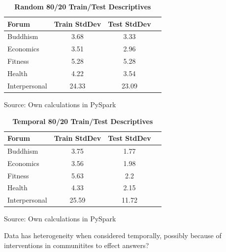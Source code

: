 \documentclass[11pt,preprint, authoryear]{article}
\numberwithin{equation}{section}
\begin{document}
\begin{longtable}[htbp] {@{} lccc @{}} 
\caption{\textbf{Random 80/20 Train/Test Descriptives}} 
\label{tab:tr-te} \\
\toprule
\textbf{Forum} &  \textbf{Train StdDev} &  \textbf{Test StdDev} \\
\midrule
Buddhism & 3.68 & 3.33 \\
Economics & 3.51 & 2.96 \\
Fitness & 5.28 & 5.28 \\
Health & 4.22 & 3.54 \\
Interpersonal & 24.33 & 23.09 \\
\bottomrule
\end{longtable}\begin{center} Source: Own calculations in PySpark\end{center}

\normalsize

\footnotesize

\begin{longtable}[htbp] {@{} lccc @{}} 
\caption{\textbf{Temporal 80/20 Train/Test Descriptives}} 
\label{tab:tr-te} \\
\toprule
\textbf{Forum} &  \textbf{Train StdDev} &  \textbf{Test StdDev} \\
\midrule
Buddhism & 3.75 & 1.77 \\
Economics & 3.56 & 1.98 \\
Fitness & 5.63 & 2.2 \\
Health & 4.33 & 2.15 \\
Interpersonal & 25.59 & 11.72 \\
\bottomrule
\end{longtable}\begin{center} Source: Own calculations in PySpark\end{center}

\normalsize

Data has heterogeneity when considered temporally, possibly because of
interventions in communitites to effect answers?

\footnotesize
\end{document}
